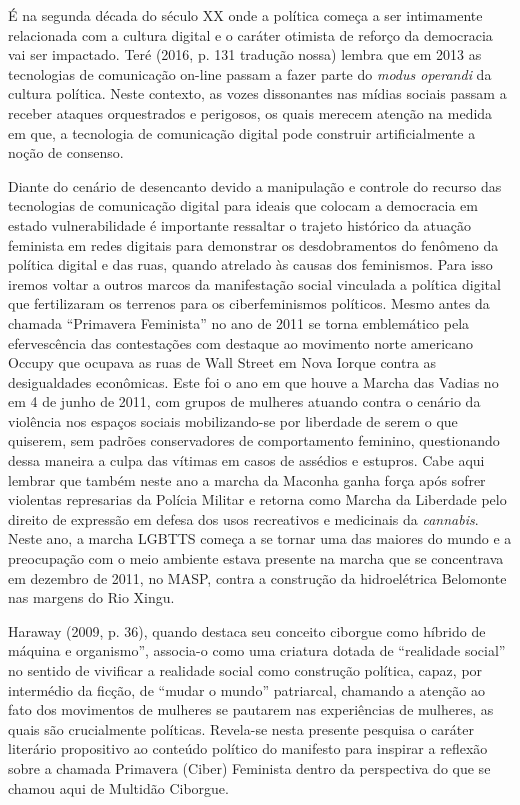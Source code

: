É na segunda década do século XX onde a política começa a ser
intimamente relacionada com a cultura digital e o caráter otimista de
reforço da democracia vai ser impactado. Teré (2016, p. 131 tradução
nossa) lembra que em 2013 as tecnologias de comunicação on-line passam a
fazer parte do \emph{modus operandi} da cultura política. Neste
contexto, as vozes dissonantes nas mídias sociais passam a receber
ataques orquestrados e perigosos, os quais merecem atenção na medida em
que, a tecnologia de comunicação digital pode construir artificialmente
a noção de consenso.

Diante do cenário de desencanto devido a manipulação e controle do
recurso das tecnologias de comunicação digital para ideais que colocam a
democracia em estado vulnerabilidade é importante ressaltar o trajeto
histórico da atuação feminista em redes digitais para demonstrar os
desdobramentos do fenômeno da política digital e das ruas, quando
atrelado às causas dos feminismos. Para isso iremos voltar a outros
marcos da manifestação social vinculada a política digital que
fertilizaram os terrenos para os ciberfeminismos políticos. Mesmo antes
da chamada ``Primavera Feminista'' no ano de 2011 se torna emblemático
pela efervescência das contestações com destaque ao movimento norte
americano Occupy que ocupava as ruas de Wall Street em Nova Iorque
contra as desigualdades econômicas. Este foi o ano em que houve a Marcha
das Vadias no em 4 de junho de 2011, com grupos de mulheres atuando
contra o cenário da violência nos espaços sociais mobilizando-se por
liberdade de serem o que quiserem, sem padrões conservadores de
comportamento feminino, questionando dessa maneira a culpa das vítimas
em casos de assédios e estupros. Cabe aqui lembrar que também neste ano
a marcha da Maconha ganha força após sofrer violentas represarias da
Polícia Militar e retorna como Marcha da Liberdade pelo direito de
expressão em defesa dos usos recreativos e medicinais da
\emph{cannabis}. Neste ano, a marcha LGBTTS começa a se tornar uma das
maiores do mundo e a preocupação com o meio ambiente estava presente na
marcha que se concentrava em dezembro de 2011, no MASP, contra a
construção da hidroelétrica Belomonte nas margens do Rio Xingu.

Haraway (2009, p. 36), quando destaca seu conceito ciborgue como híbrido
de máquina e organismo'', associa-o como uma criatura dotada de
``realidade social'' no sentido de vivificar a realidade social como
construção política, capaz, por intermédio da ficção, de ``mudar o
mundo'' patriarcal, chamando a atenção ao fato dos movimentos de
mulheres se pautarem nas experiências de mulheres, as quais são
crucialmente políticas. Revela-se nesta presente pesquisa o caráter
literário propositivo ao conteúdo político do manifesto para inspirar a
reflexão sobre a chamada Primavera (Ciber) Feminista dentro da
perspectiva do que se chamou aqui de Multidão Ciborgue.


